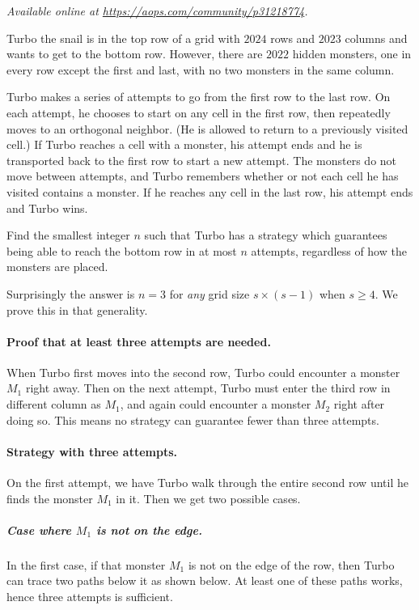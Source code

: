 \textsl{Available online at \url{https://aops.com/community/p31218774}.}
\begin{mdframed}[style=mdpurplebox,frametitle={Problem statement}]
Turbo the snail is in the top row of a grid with $2024$ rows and $2023$ columns
and wants to get to the bottom row.
However, there are $2022$ hidden monsters, one in every row except the first and last,
with no two monsters in the same column.

Turbo makes a series of attempts to go from the first row to the last row.
On each attempt, he chooses to start on any cell in the first row,
then repeatedly moves to an orthogonal neighbor.
(He is allowed to return to a previously visited cell.)
If Turbo reaches a cell with a monster,
his attempt ends and he is transported back to the first row to start a new attempt.
The monsters do not move between attempts, and Turbo remembers whether or not each cell
he has visited contains a monster.
If he reaches any cell in the last row, his attempt ends and Turbo wins.

Find the smallest integer $n$ such that Turbo has a strategy which guarantees
being able to reach the bottom row in at most $n$ attempts,
regardless of how the monsters are placed.
\end{mdframed}
Surprisingly the answer is $n = 3$ for \emph{any} grid size $s \times (s-1)$ when $s \ge 4$.
We prove this in that generality.

\paragraph{Proof that at least three attempts are needed.}
When Turbo first moves into the second row, Turbo could encounter a monster $M_1$ right away.
Then on the next attempt, Turbo must enter the third row in different column as $M_1$,
and again could encounter a monster $M_2$ right after doing so.
This means no strategy can guarantee fewer than three attempts.

\paragraph{Strategy with three attempts.}
On the first attempt, we have Turbo walk through the entire second row
until he finds the monster $M_1$ in it.
Then we get two possible cases.

\subparagraph{Case where $M_1$ is not on the edge.}
In the first case, if that monster $M_1$ is not on the edge of the row,
then Turbo can trace two paths below it as shown below.
At least one of these paths works, hence three attempts is sufficient.

